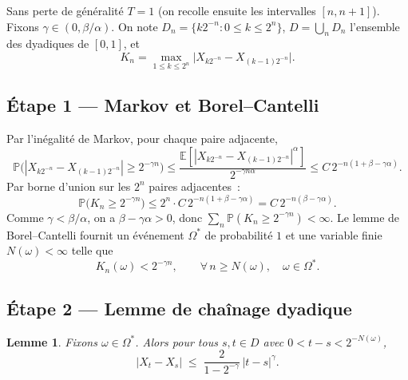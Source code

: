 \documentclass[11pt,a4paper]{article}
\theoremstyle{plain}
\newtheorem{lemme}[theoreme]{Lemme}
\theoremstyle{definition}
\newcommand{\Esp}{\mathbb{E}}
\newcommand{\Prob}{\mathbb{P}}
\newcommand{\abs}[1]{\left\lvert #1 \right\rvert}
\begin{document}
Sans perte de g\'en\'eralit\'e $T=1$ (on recolle ensuite les intervalles $[n,n+1]$). Fixons $\gamma\in(0,\beta/\alpha)$. On note $D_n=\{k2^{-n}:0\le k\le 2^n\}$, $D=\bigcup_n D_n$ l'ensemble des dyadiques de $[0,1]$, et
\[
K_n=\max_{1\le k\le 2^n}\bigl\lvert X_{k2^{-n}}-X_{(k-1)2^{-n}}\bigr\rvert.
\]

\subsection*{\'Etape 1 — Markov et Borel--Cantelli}

Par l'in\'egalit\'e de Markov, pour chaque paire adjacente,
\[
\Prob\bigl(\abs{X_{k2^{-n}}-X_{(k-1)2^{-n}}}\ge 2^{-\gamma n}\bigr)
\le \frac{\Esp[\abs{X_{k2^{-n}}-X_{(k-1)2^{-n}}}^{\alpha}]}{2^{-\gamma n\alpha}}
\le C\,2^{-n(1+\beta-\gamma\alpha)}.
\]
Par borne d'union sur les $2^n$ paires adjacentes~:
\[
\Prob\bigl(K_n\ge 2^{-\gamma n}\bigr)\le 2^n\cdot C\,2^{-n(1+\beta-\gamma\alpha)}=C\,2^{-n(\beta-\gamma\alpha)}.
\]
Comme $\gamma<\beta/\alpha$, on a $\beta-\gamma\alpha>0$, donc $\sum_n\Prob(K_n\ge 2^{-\gamma n})<\infty$. Le lemme de Borel--Cantelli fournit un \'ev\'enement $\Omega^\ast$ de probabilit\'e $1$ et une variable finie $N(\omega)<\infty$ telle que
\[
K_n(\omega)<2^{-\gamma n},\qquad\forall\,n\ge N(\omega),\quad\omega\in\Omega^\ast.
\]

\subsection*{\'Etape 2 — Lemme de cha\^inage dyadique}

\begin{lemme}
Fixons $\omega\in\Omega^\ast$. Alors pour tous $s,t\in D$ avec $0<t-s<2^{-N(\omega)}$,
\[
\abs{X_t-X_s}\;\le\;\frac{2}{1-2^{-\gamma}}\,\abs{t-s}^{\gamma}.
\]
\end{lemme}
\end{document}

